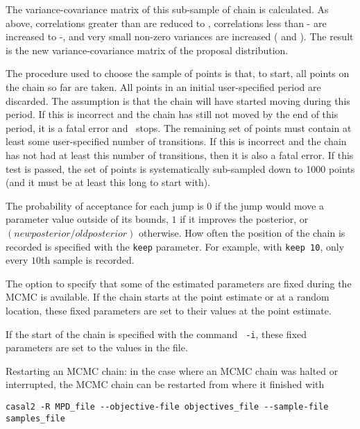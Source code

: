 The variance-covariance matrix of this sub-sample of chain is calculated. As above, correlations greater than  are reduced to , correlations less than - are increased to  -, and very small non-zero variances are increased ( and ). The result is the new variance-covariance matrix of the proposal distribution.

The procedure used to choose the sample of points is that, to start, all points on the chain so far are taken.  All points in an initial user-specified period are discarded. The assumption is that the chain will have started moving during this period. If this is incorrect and the chain has still not moved by the end of this period, it is a fatal error and \CNAME\ stops. The remaining set of points must contain at least some user-specified number of transitions. If this is incorrect and the chain has not had at least this number of transitions, then it is also a fatal error. If this test is passed, the set of points is systematically sub-sampled down to 1000 points (and it must be at least this long to start with).

The probability of acceptance for each jump is $0$ if the jump would move a parameter value outside of its bounds, $1$ if it improves the posterior, or $(new posterior/old posterior)$ otherwise. How often the position of the chain is recorded is specified with the \texttt{keep} parameter. For example, with \texttt{keep 10}, only every $10$th sample is recorded.

The option to specify that some of the estimated parameters are fixed during the MCMC is available. If the chain starts at the point estimate or at a random location, these fixed parameters are set to their values at the point estimate.

If  the start of the chain is specified with the command \texttt{\cname\ -i}, these fixed parameters are set to the values in the file.

Restarting an MCMC chain: in the case where an MCMC chain was halted or interrupted, the MCMC chain can be restarted from where it finished with

{\small{\begin{verbatim}
casal2 -R MPD_file --objective-file objectives_file --sample-file samples_file
\end{verbatim}}}

